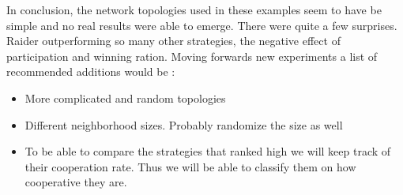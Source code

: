 In conclusion, the network topologies used in these examples seem to have be
simple and no real results were able to emerge. There were quite a few surprises.
Raider outperforming so many other strategies, the negative effect of participation
and winning ration. Moving forwards new experiments a list of recommended
additions would be :
\begin{itemize}
  \item More complicated and random topologies
  \item Different neighborhood sizes. Probably randomize the size as well
  \item To be able to compare the strategies that ranked high we will keep track
        of their cooperation rate. Thus we will be able to classify them
        on how cooperative they are.
\end{itemize}
